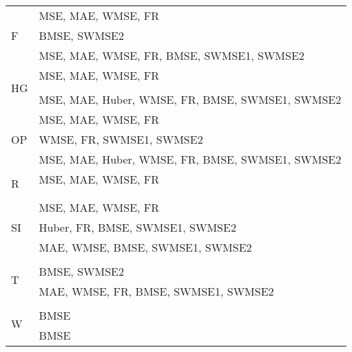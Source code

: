 \documentclass[11pt, a4paper]{article}
\begin{document}
\begin{table}[H]
\begin{tabular}{ll}
\multirow{3}{*}{F}                    & MSE, MAE, WMSE, FR                              \\
                                      & BMSE, SWMSE2                                    \\
                                      & MSE, MAE, WMSE, FR, BMSE, SWMSE1, SWMSE2        \\ \hline
\multirow{3}{*}{HG}                   & MSE, MAE, WMSE, FR                              \\
                                      &                                                 \\
                                      & MSE, MAE, Huber, WMSE, FR, BMSE, SWMSE1, SWMSE2 \\ \hline
\multirow{3}{*}{OP}                   & MSE, MAE, WMSE, FR                              \\
                                      & WMSE, FR, SWMSE1, SWMSE2                        \\
                                      & MSE, MAE, Huber, WMSE, FR, BMSE, SWMSE1, SWMSE2 \\ \hline
\multirow{3}{*}{R}                    & MSE, MAE, WMSE, FR                              \\
                                      &                                                 \\
                                      &                                                 \\ \hline
\multirow{3}{*}{SI}                   & MSE, MAE, WMSE, FR                              \\
                                      & Huber, FR, BMSE, SWMSE1, SWMSE2                 \\
                                      & MAE, WMSE, BMSE, SWMSE1, SWMSE2                 \\ \hline
\multirow{3}{*}{T}                    &                                                 \\
                                      & BMSE, SWMSE2                                    \\
                                      & MAE, WMSE, FR, BMSE, SWMSE1, SWMSE2             \\ \hline
\multirow{3}{*}{W}                    &                                                 \\
                                      & BMSE                                            \\
                                      & BMSE
\end{tabular}
\end{table}
\end{document}
